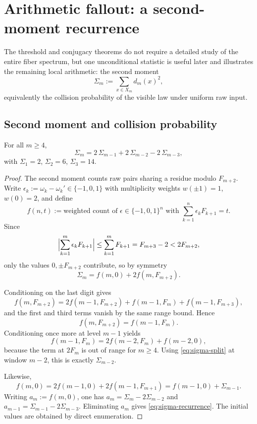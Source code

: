 \section{Arithmetic fallout: a second-moment recurrence}\label{sec:fiber-spectrum}

The threshold and conjugacy theorems do not require a detailed study of the entire fiber spectrum, but one unconditional statistic is useful later and illustrates the remaining local arithmetic: the second moment
\[
\Sigma_m:=\sum_{x\in X_m}d_m(x)^2,
\]
equivalently the collision probability of the visible law under uniform raw input.

\subsection{Second moment and collision probability}\label{sec:fiber-collision}

\begin{theorem}\label{prop:second-moment-recurrence}
For all $m\ge 4$,
\begin{equation}\label{eq:sigma-recurrence}
\Sigma_m=2\,\Sigma_{m-1}+2\,\Sigma_{m-2}-2\,\Sigma_{m-3},
\end{equation}
with $\Sigma_1=2$, $\Sigma_2=6$, $\Sigma_3=14$.
\end{theorem}

\begin{proof}
The second moment counts raw pairs sharing a residue modulo $F_{m+2}$. Write $\epsilon_k:=\omega_k-\omega_k'\in\{-1,0,1\}$ with multiplicity weights $w(\pm1)=1$, $w(0)=2$, and define
\[
f(n,t):=\text{weighted count of }\epsilon\in\{-1,0,1\}^n\text{ with }\sum_{k=1}^n \epsilon_kF_{k+1}=t.
\]
Since
\[
\Bigl|\sum_{k=1}^m \epsilon_kF_{k+1}\Bigr|\le \sum_{k=1}^mF_{k+1}=F_{m+3}-2<2F_{m+2},
\]
only the values $0,\pm F_{m+2}$ contribute, so by symmetry
\begin{equation}\label{eq:sigma-split}
\Sigma_m=f(m,0)+2f(m,F_{m+2}).
\end{equation}

Conditioning on the last digit gives
\[
f(m,F_{m+2})=2f(m-1,F_{m+2})+f(m-1,F_m)+f(m-1,F_{m+3}),
\]
and the first and third terms vanish by the same range bound. Hence
\[
f(m,F_{m+2})=f(m-1,F_m).
\]
Conditioning once more at level $m-1$ yields
\[
f(m-1,F_m)=2f(m-2,F_m)+f(m-2,0),
\]
because the term at $2F_m$ is out of range for $m\ge4$. Using \eqref{eq:sigma-split} at window $m-2$, this is exactly $\Sigma_{m-2}$.

Likewise,
\[
f(m,0)=2f(m-1,0)+2f(m-1,F_{m+1})=f(m-1,0)+\Sigma_{m-1}.
\]
Writing $a_m:=f(m,0)$, one has $a_m=\Sigma_m-2\Sigma_{m-2}$ and $a_{m-1}=\Sigma_{m-1}-2\Sigma_{m-3}$. Eliminating $a_m$ gives \eqref{eq:sigma-recurrence}. The initial values are obtained by direct enumeration.
\end{proof}


